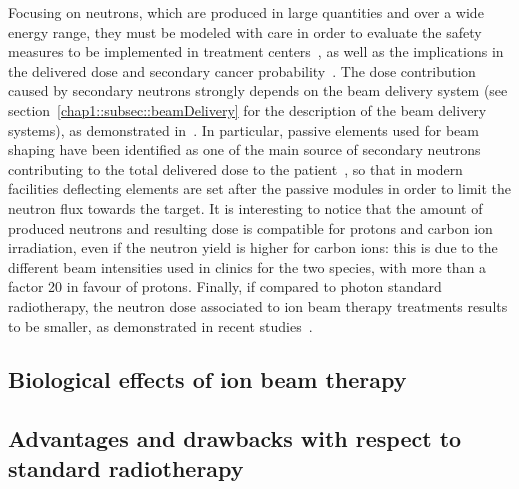 Focusing on neutrons, which are produced in large quantities and over a wide energy range, they must be modeled with care in order to evaluate the safety measures to be implemented in treatment centers~\parencite{Newhauser2002}, as well as the implications in the delivered dose and secondary cancer probability~\parencite{Newhauser2011}. The dose contribution caused by secondary neutrons strongly depends on the beam delivery system (see section~\ref{chap1::subsec::beamDelivery} for the description of the beam delivery systems), as demonstrated in~\cite{Gottschalk2006}. In particular, passive elements used for beam shaping have been identified as one of the main source of secondary neutrons contributing to the total delivered dose to the patient~\parencite{Yan2002}, so that in modern facilities deflecting elements are set after the passive modules in order to limit the neutron flux towards the target. It is interesting to notice that the amount of produced neutrons and resulting dose is compatible for protons and carbon ion irradiation, even if the neutron yield is higher for carbon ions: this is due to the different beam intensities used in clinics for the two species, with more than a factor 20 in favour of protons. Finally, if compared to photon standard radiotherapy, the neutron dose associated to ion beam therapy treatments results to be smaller, as demonstrated in recent studies~\parencite{Schneider2015}.\\

\subsection{Biological effects of ion beam therapy}\label{chap1::subsec::bioEffects} 



\subsection{Advantages and drawbacks with respect to standard radiotherapy}\label{chap1::subsec::ProContro}

